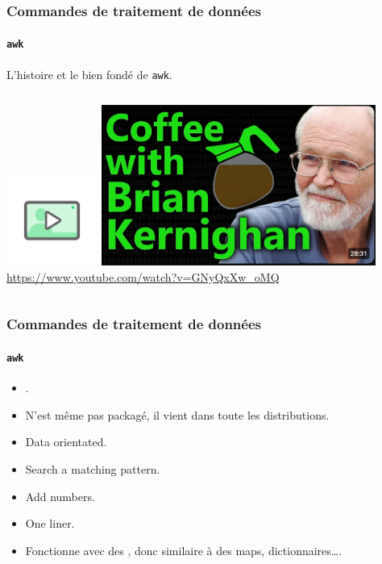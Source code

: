 \documentclass{beamer}
\begin{document}
    \begin{frame}
        \transdissolve
        \frametitle{Commandes de traitement de données}
        \framesubtitle{\lstinline{awk}}
        L'histoire et le bien fondé de \lstinline{awk}.
        \bigbreak
        \begin{columns}
            \centering
            \includegraphics[width=3cm]{image/digicomp-video}
            \includegraphics[width=9cm]{image/coffee-with-bk} \\ \url{https://www.youtube.com/watch?v=GNyQxXw_oMQ} \\
        \end{columns}
    \end{frame}

    \begin{frame}
        \transdissolve
        \frametitle{Commandes de traitement de données}
        \framesubtitle{\lstinline{awk}}
        \begin{itemize}
            \item {}.
            \item N'est même pas packagé, il vient dans toute les distributions.
            \item Data orientated.
            \item Search a matching pattern.
            \item Add numbers.
            \item One liner.
            \item Fonctionne avec des , donc similaire à des maps, dictionnaires\ldots.
        \end{itemize}
    \end{frame}
\end{document}
